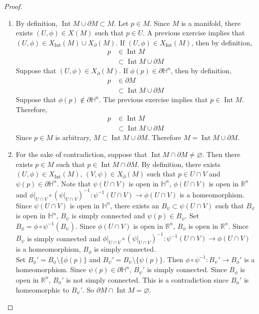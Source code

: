 \documentclass{book}
\theoremstyle{definition}
\renewcommand{\H}{\mathbb{H}}
\newcommand{\R}{\mathbb{R}}
\DeclareMathOperator{\Int}{Int}
\DeclareMathOperator*{\0}{\mbf{0}}
\DeclareMathOperator*{\1}{\mbf{1}}
\newcommand{\p}{\partial}
\begin{document}
	\begin{proof}\
		\begin{enumerate}
			\item By definition, $\Int M \cup \p M \subset M$. Let $p \in M$. Since $M$ is a manifold, there exists $(U, \phi) \in X(M)$ such that $p \in U$. A previous exercise implies that $(U, \phi) \in X_{\Int}(M) \cup X_{\p}(M)$. If $(U, \phi) \in X_{\Int}(M)$, then by definition, 
			\begin{align*}
				p 
				& \in \Int M \\
				& \subset \Int M \cup \p M
			\end{align*}        
			Suppose that $(U, \phi) \in X_{\p}(M)$. If $\phi(p) \in \p \H^n$, then by definition, 
			\begin{align*}
				p 
				& \in \p M \\
				& \subset \Int M \cup \p M
			\end{align*}   
			Suppose that $\phi(p) \not \in \p \H^n$. The previous exercise implies that $p \in \Int M$. Therefore, 
			\begin{align*}
				p 
				& \in \Int M \\
				& \subset \Int M \cup \p M
			\end{align*}        
			Since $p \in M$ is arbitrary, $M \subset \Int M \cup \p M$. Therefore $M = \Int M \cup \p M$.
			\item For the sake of contradiction, suppose that $\Int M \cap \p M \neq \varnothing$. Then there exists $p \in M$ such that $p \in \Int M \cap \p M$. By definition, there exists $(U, \phi) \in X_{\Int}(M)$, $(V, \psi) \in X_{\p}(M)$ such that $p \in U \cap V$ and $\psi(p) \in \p \H^n$. Note that $\psi(U \cap V)$ is open in $\H^n$, $\phi(U \cap V)$ is open in $\R^n$ and $\phi|_{U \cap V} \circ (\psi|_{U \cap V})^{-1}: \psi^{-1}(U \cap V) \rightarrow \phi(U \cap V)$ is a homeomorphism.\\ 
			Since $\psi(U \cap V)$ is open in $\H^n$, there exists an $B_{\psi} \subset \psi(U \cap V)$ such that $B_{\psi}$ is open in $\H^n$, $B_{\psi}$ is simply connected and $\psi(p) \in B_{\psi}$. Set $B_{\phi} = \phi \circ \psi^{-1}(B_{\psi})$. Since $\phi(U \cap V)$ is open in $\R^n$, $B_{\phi}$ is open in $\R^n$. Since $B_{\psi}$ is simply connected and $\phi|_{U \cap V} \circ (\psi|_{U \cap V})^{-1}: \psi^{-1}(U \cap V) \rightarrow \phi(U \cap V)$ is a homeomorphism, $B_{\phi}$ is simply connected. \\
			Set $B_{\phi}' = B_{\phi} \setminus \{\phi(p)\}$ and $B_{\psi}' = B_{\psi} \setminus \{\psi(p)\}$. Then $\phi \circ \psi^{-1}: B_{\psi}' \rightarrow B_{\phi}'$ is a homeomorphism. Since $\psi(p) \in \p \H^n$, $B_{\psi}'$ is simply connected. Since $B_{\phi}$ is open in $\R^n$, $B_{\phi}'$ is not simply connected. This is a contradiction since $B_{\phi}'$ is homeomorphic to $B_{\psi}'$. So $\p M \cap \Int M = \varnothing$. 
		\end{enumerate}
	\end{proof}
\end{document}
